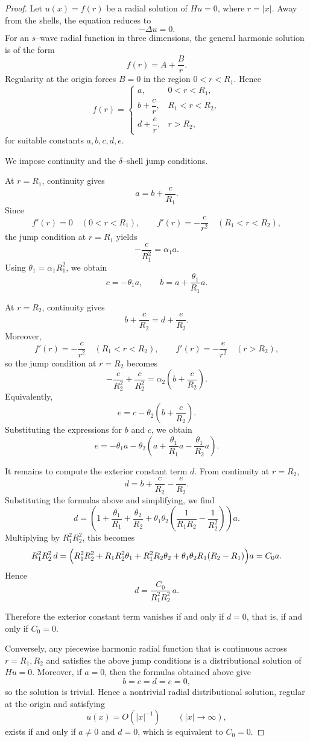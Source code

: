 \documentclass[a4paper,11pt]{article}
\numberwithin{equation}{section}
\theoremstyle{definition}
\theoremstyle{remark}
\begin{document}
\begin{proof}
Let $u(x)=f(r)$ be a radial solution of $Hu=0$, where $r=|x|$. Away from the
shells, the equation reduces to
\[
-\Delta u=0.
\]
For an $s$--wave radial function in three dimensions, the general harmonic
solution is of the form
\[
f(r)=A+\frac{B}{r}.
\]
Regularity at the origin forces $B=0$ in the region $0<r<R_1$. Hence
\[
f(r)=
\begin{cases}
a, & 0<r<R_1,\\[2mm]
b+\dfrac{c}{r}, & R_1<r<R_2,\\[3mm]
d+\dfrac{e}{r}, & r>R_2,
\end{cases}
\]
for suitable constants $a,b,c,d,e$.

We impose continuity and the $\delta$--shell jump conditions.

At $r=R_1$, continuity gives
\[
a=b+\frac{c}{R_1}.
\]
Since
\[
f'(r)=0 \quad (0<r<R_1),
\qquad
f'(r)=-\frac{c}{r^2}\quad (R_1<r<R_2),
\]
the jump condition at $r=R_1$ yields
\[
-\frac{c}{R_1^2}
=
\alpha_1 a.
\]
Using $\theta_1=\alpha_1R_1^2$, we obtain
\[
c=-\theta_1 a,
\qquad
b=a+\frac{\theta_1}{R_1}a.
\]

At $r=R_2$, continuity gives
\[
b+\frac{c}{R_2}=d+\frac{e}{R_2}.
\]
Moreover,
\[
f'(r)=-\frac{c}{r^2}\quad (R_1<r<R_2),
\qquad
f'(r)=-\frac{e}{r^2}\quad (r>R_2),
\]
so the jump condition at $r=R_2$ becomes
\[
-\frac{e}{R_2^2}+\frac{c}{R_2^2}
=
\alpha_2\left(b+\frac{c}{R_2}\right).
\]
Equivalently,
\[
e
=
c-\theta_2\left(b+\frac{c}{R_2}\right).
\]
Substituting the expressions for $b$ and $c$, we obtain
\[
e
=
-\theta_1 a
-
\theta_2
\left(
a+\frac{\theta_1}{R_1}a-\frac{\theta_1}{R_2}a
\right).
\]

It remains to compute the exterior constant term $d$. From continuity at
$r=R_2$,
\[
d
=
b+\frac{c}{R_2}-\frac{e}{R_2}.
\]
Substituting the formulas above and simplifying, we find
\[
d
=
\left(
1+\frac{\theta_1}{R_1}
+\frac{\theta_2}{R_2}
+\theta_1\theta_2
\left(
\frac{1}{R_1R_2}-\frac{1}{R_2^2}
\right)
\right)a.
\]
Multiplying by $R_1^2R_2^2$, this becomes
\[
R_1^2R_2^2\,d
=
\Bigl(
R_1^2R_2^2
+
R_1R_2^2\theta_1
+
R_1^2R_2\theta_2
+
\theta_1\theta_2R_1(R_2-R_1)
\Bigr)a
=
C_0a.
\]
Hence
\[
d=\frac{C_0}{R_1^2R_2^2}\,a.
\]

Therefore the exterior constant term vanishes if and only if $d=0$, that is,
if and only if $C_0=0$.

Conversely, any piecewise harmonic radial function that is continuous across
$r=R_1,R_2$ and satisfies the above jump conditions is a distributional
solution of $Hu=0$. Moreover, if $a=0$, then the formulas obtained above give
\[
b=c=d=e=0,
\]
so the solution is trivial. Hence a nontrivial radial distributional solution,
regular at the origin and satisfying
\[
u(x)=O(|x|^{-1})
\qquad (|x|\to\infty),
\]
exists if and only if $a\neq0$ and $d=0$, which is equivalent to $C_0=0$.
\end{proof}
\end{document}
